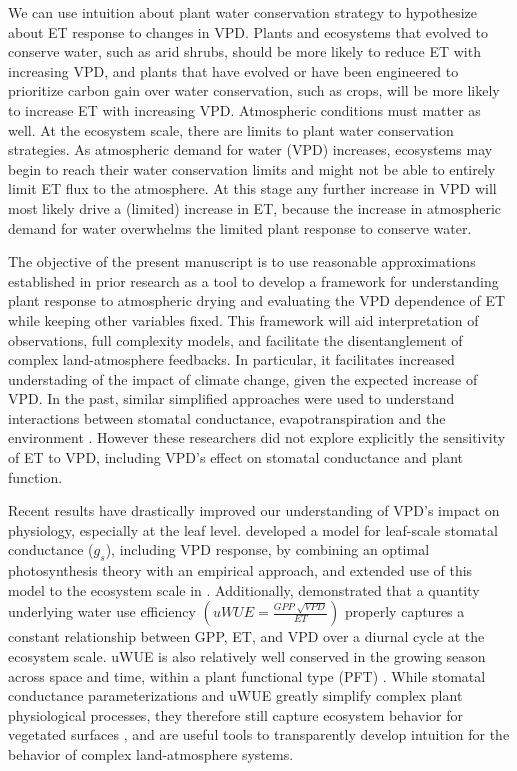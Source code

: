 We can use intuition about plant water conservation strategy to
hypothesize about ET response to changes in VPD. Plants and ecosystems
that evolved to conserve water, such as arid shrubs, should be more
likely to reduce ET with increasing VPD, and plants that have evolved
or have been engineered to prioritize carbon gain over water
conservation, such as crops, will be more likely to increase ET with
increasing VPD. Atmospheric conditions must matter as well. At the
ecosystem scale, there are limits to plant water conservation
strategies. As atmospheric demand for water (VPD) increases,
ecosystems may begin to reach their water conservation limits and
might not be able to entirely limit ET flux to the atmosphere. At this
stage any further increase in VPD will most likely drive a (limited)
increase in ET, because the increase in atmospheric demand for water
overwhelms the limited plant response to conserve water.

The objective of the present manuscript is to use reasonable
approximations established in prior research as a tool to develop a
framework for understanding plant response to atmospheric drying and
evaluating the VPD dependence of ET while keeping other variables
fixed. This framework will aid interpretation of observations, full
complexity models, and facilitate the disentanglement of complex
land-atmosphere feedbacks. In particular, it facilitates increased
understading of the impact of climate change, given the expected
increase of VPD.  In the past, similar simplified approaches were used
to understand interactions between stomatal conductance,
evapotranspiration and the environment \citep[e.g.,][]{Jarvis_1984,
Jarvis_1986, Mcnaughton_1991}. However these researchers did not
explore explicitly the sensitivity of ET to VPD, including VPD's
effect on stomatal conductance and plant function.

Recent results have drastically improved our understanding of VPD's
impact on physiology, especially at the leaf
level. \citet{MEDLYN_2011} developed a model for leaf-scale stomatal
conductance ($g_s$), including VPD response, by combining an optimal
photosynthesis theory \citep{Cowan_1977, Katul_2009, Katul_2010} with an empirical
approach, and extended use of this model to the ecosystem scale in
\citet{Medlyn_2017}. Additionally, \citet{Zhou_2014} demonstrated that
a quantity underlying water use efficiency $\left(uWUE = \frac{GPP\;
\sqrt{VPD}}{ET}\right)$ properly captures a constant relationship
between GPP, ET, and VPD over a diurnal cycle at the ecosystem
scale. uWUE is also relatively well conserved in the growing season
across space and time, within a plant functional type (PFT)
\citep{Zhou_2015}.  While stomatal conductance parameterizations and
uWUE greatly simplify complex plant physiological processes, they
therefore still capture ecosystem behavior for vegetated surfaces
\citep{Medlyn_2017, Zhou_2014}, and are useful tools to transparently
develop intuition for the behavior of complex land-atmosphere systems.

